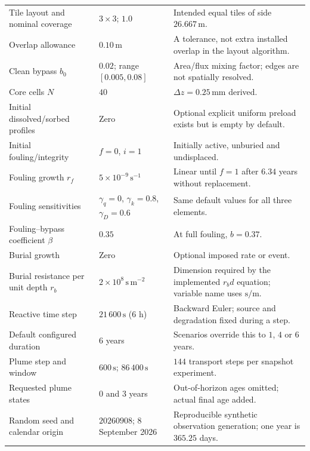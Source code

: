\begin{longtable}{@{}p{}p{}p{}@{}}
Tile layout and nominal coverage & $3\times3$; $1.0$ & Intended equal tiles of side $26.667\,\mathrm{m}$. \\
Overlap allowance & $0.10\,\mathrm{m}$ & A tolerance, not extra installed overlap in the layout algorithm. \\
Clean bypass $b_0$ & $0.02$; range $[0.005,0.08]$ & Area/flux mixing factor; edges are not spatially resolved. \\
Core cells $N$ & $40$ & $\Delta z=0.25\,\mathrm{mm}$ derived. \\
Initial dissolved/sorbed profiles & Zero & Optional explicit uniform preload exists but is empty by default. \\
Initial fouling/integrity & $f=0$, $i=1$ & Initially active, unburied and undisplaced. \\
Fouling growth $r_f$ & $5\times10^{-9}\,\mathrm{s^{-1}}$ & Linear until $f=1$ after $6.34$ years without replacement. \\
Fouling sensitivities & $\gamma_q=0$, $\gamma_k=0.8$, $\gamma_D=0.6$ & Same default values for all three elements. \\
Fouling--bypass coefficient $\beta$ & $0.35$ & At full fouling, $b=0.37$. \\
Burial growth & Zero & Optional imposed rate or event. \\
Burial resistance per unit depth $r_b$ & $2\times10^8\,\mathrm{s\,m^{-2}}$ & Dimension required by the implemented $r_bd$ equation; variable name uses $\mathrm{s/m}$. \\
Reactive time step & $21\,600\,\mathrm{s}$ ($6$ h) & Backward Euler; source and degradation fixed during a step. \\
Default configured duration & $6$ years & Scenarios override this to $1$, $4$ or $6$ years. \\
Plume step and window & $600\,\mathrm{s}$; $86\,400\,\mathrm{s}$ & $144$ transport steps per snapshot experiment. \\
Requested plume states & $0$ and $3$ years & Out-of-horizon ages omitted; actual final age added. \\
Random seed and calendar origin & $20260908$; 8 September 2026 & Reproducible synthetic observation generation; one year is $365.25$ days. \\
\end{longtable}

